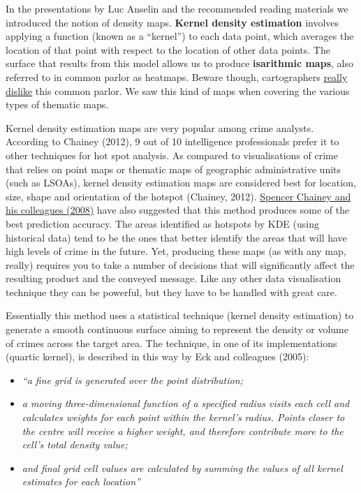 \documentclass[]{book}
\providecommand{\tightlist}{%
  \setlength{\itemsep}{0pt}\setlength{\parskip}{0pt}}
\begin{document}
In the presentations by Luc Anselin and the recommended reading materials we introduced the notion of density maps. \textbf{Kernel density estimation} involves applying a function (known as a ``kernel'') to each data point, which averages the location of that point with respect to the location of other data points. The surface that results from this model allows us to produce \textbf{isarithmic maps}, also referred to in common parlor as heatmaps. Beware though, cartographers \href{http://cartonerd.blogspot.com/2015/02/when-is-heat-map-not-heat-map.html}{really dislike} this common parlor. We saw this kind of maps when covering the various types of thematic maps.

Kernel density estimation maps are very popular among crime analysts. According to Chainey (2012), 9 out of 10 intelligence professionals prefer it to other techniques for hot spot analysis. As compared to visualisations of crime that relies on point maps or thematic maps of geographic administrative units (such as LSOAs), kernel density estimation maps are considered best for location, size, shape and orientation of the hotspot (Chainey, 2012). \href{http://discovery.ucl.ac.uk/112873/1/PREPRINT_-_Chainey\%2C_Tompson_\%26_Uhlig_2008.pdf}{Spencer Chainey and his colleagues (2008)} have also suggested that this method produces some of the best prediction accuracy. The areas identified as hotspots by KDE (using historical data) tend to be the ones that better identify the areas that will have high levels of crime in the future. Yet, producing these maps (as with any map, really) requires you to take a number of decisions that will significantly affect the resulting product and the conveyed message. Like any other data visualisation technique they can be powerful, but they have to be handled with great care.

Essentially this method uses a statistical technique (kernel density estimation) to generate a smooth continuous surface aiming to represent the density or volume of crimes across the target area. The technique, in one of its implementations (quartic kernel), is described in this way by Eck and colleagues (2005):

\begin{itemize}
\tightlist
\item
  \emph{``a fine grid is generated over the point distribution;}
\item
  \emph{a moving three-dimensional function of a specified radius visits each cell and calculates weights for each point within the kernel's radius. Points closer to the centre will receive a higher weight, and therefore contribute more to the cell's total density value;}
\item
  \emph{and final grid cell values are calculated by summing the values of all kernel estimates for each location''}
\end{itemize}
\end{document}
